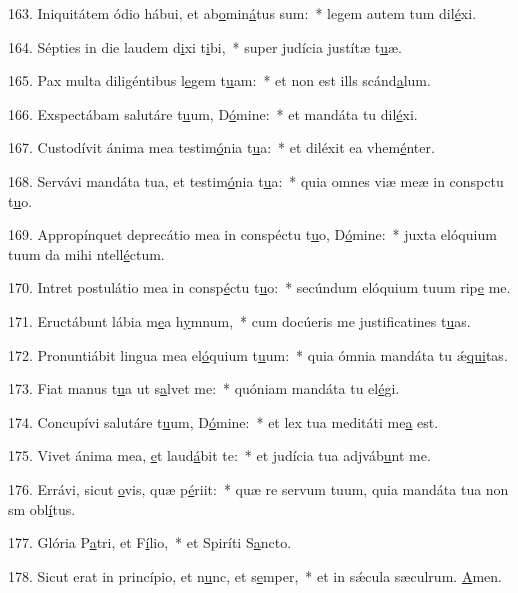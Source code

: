 163. Iniquitátem ódio hábui, et ab\uline{o}min\uline{á}tus sum:~* legem autem tum dil\uline{é}xi.\par 
164. Sépties in die laudem d\uline{i}xi t\uline{i}bi,~* super judícia justítæ t\uline{u}æ.\par 
165. Pax multa diligéntibus l\uline{e}gem t\uline{u}am:~* et non est ills scánd\uline{a}lum.\par 
166. Exspectábam salutáre t\uline{u}um, D\uline{ó}mine:~* et mandáta tu dil\uline{é}xi.\par 
167. Custodívit ánima mea testim\uline{ó}nia t\uline{u}a:~* et diléxit ea vhem\uline{é}nter.\par 
168. Servávi mandáta tua, et testim\uline{ó}nia t\uline{u}a:~* quia omnes viæ meæ in conspctu t\uline{u}o.\par 
169. Appropínquet deprecátio mea in conspéctu t\uline{u}o, D\uline{ó}mine:~* juxta elóquium tuum da mihi ntell\uline{é}ctum.\par 
170. Intret postulátio mea in consp\uline{é}ctu t\uline{u}o:~* secúndum elóquium tuum rip\uline{e} me.\par 
171. Eructábunt lábia m\uline{e}a h\uline{y}mnum,~* cum docúeris me justificatines t\uline{u}as.\par 
172. Pronuntiábit lingua mea el\uline{ó}quium t\uline{u}um:~* quia ómnia mandáta tu ǽ\uline{qui}tas.\par 
173. Fiat manus t\uline{u}a ut s\uline{a}lvet me:~* quóniam mandáta tu el\uline{é}gi.\par 
174. Concupívi salutáre t\uline{u}um, D\uline{ó}mine:~* et lex tua meditáti me\uline{a} est.\par 
175. Vivet ánima mea, \uline{e}t laud\uline{á}bit te:~* et judícia tua adjváb\uline{u}nt me.\par 
176. Errávi, sicut \uline{o}vis, quæ p\uline{é}riit:~* quæ re servum tuum, quia mandáta tua non sm obl\uline{í}tus.\par 
177. Glória P\uline{a}tri, et F\uline{í}lio,~* et Spiríti S\uline{a}ncto.\par 
178. Sicut erat in princípio, et n\uline{u}nc, et s\uline{e}mper,~* et in sǽcula sæculrum. \uline{A}men.\par 
